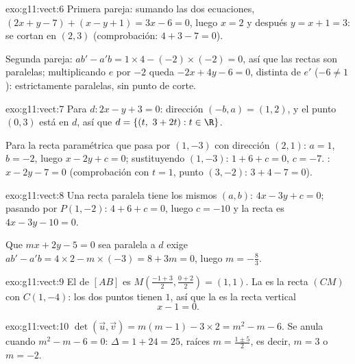 \begin{solution}{exo:g11:vect:6}
Primera pareja: sumando las dos ecuaciones,
$(2x + y - 7) + (x - y + 1) = 3x - 6 = 0$, luego $x = 2$ y después
$y = x + 1 = 3$: se cortan en $(2, 3)$ (comprobación: $4 + 3 - 7 = 0$).

Segunda pareja: $ab' - a'b = 1 \times 4 - (-2) \times (-2) = 0$, así que
las rectas son paralelas; multiplicando $e$ por $-2$ queda
$-2x + 4y - 6 = 0$, distinta de $e'$ ($-6 \neq 1$): estrictamente
paralelas, sin punto de corte.
\end{solution}

\begin{solution}{exo:g11:vect:7}
Para $d: 2x - y + 3 = 0$: dirección $(-b, a) = (1, 2)$, y el punto
$(0, 3)$ está en $d$, así que $d = \{(t,\ 3 + 2t) : t \in \R\}$.

Para la recta paramétrica que pasa por $(1, -3)$ con dirección $(2, 1)$:
$a = 1$, $b = -2$, luego $x - 2y + c = 0$; sustituyendo $(1, -3)$:
$1 + 6 + c = 0$, $c = -7$. : $x - 2y - 7 = 0$ (comprobación con
$t = 1$, punto $(3, -2)$: $3 + 4 - 7 = 0$).
\end{solution}

\begin{solution}{exo:g11:vect:8}
Una recta paralela tiene los mismos $(a, b)$: $4x - 3y + c = 0$; pasando
por $P(1, -2)$: $4 + 6 + c = 0$, luego $c = -10$ y la recta es
$4x - 3y - 10 = 0$.

Que $mx + 2y - 5 = 0$ sea paralela a $d$ exige
$ab' - a'b = 4 \times 2 - m \times (-3) = 8 + 3m = 0$, luego
$m = -\frac83$.
\end{solution}

\begin{solution}{exo:g11:vect:9}
El  de $[AB]$ es
$M\!\left(\frac{-1+3}{2}, \frac{0+2}{2}\right) = (1, 1)$. La  es la
recta $(CM)$ con $C(1, -4)$: los dos puntos tienen  $1$, así que la
 es la recta vertical
\[
x - 1 = 0 .
\]
\end{solution}

\begin{solution}{exo:g11:vect:10}
$\det(\vec u, \vec v) = m(m - 1) - 3 \times 2 = m^2 - m - 6$. Se anula
cuando $m^2 - m - 6 = 0$: $\Delta = 1 + 24 = 25$, raíces
$m = \frac{1 \pm 5}{2}$, es decir, $m = 3$ o $m = -2$.
\end{solution}

